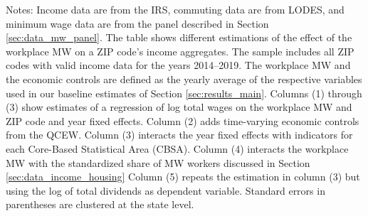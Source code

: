 \begin{table}[hbt!]
    \begin{minipage}{.95\textwidth} \footnotesize
        \vspace{2mm}
        Notes: 
        Income data are from the IRS, commuting data are from LODES, and minimum wage 
        data are from the panel described in Section \ref{sec:data_mw_panel}.
        The table shows different estimations of the effect of the workplace MW
        on a ZIP code's income aggregates.
        The sample includes all ZIP codes with valid income data for the years 
        2014--2019.
        The workplace MW and the economic controls are defined as the yearly 
        average of the respective variables used in our baseline estimates of 
        Section \ref{sec:results_main}.
        Columns (1) through (3) show estimates of a regression of log total wages
        on the workplace MW and ZIP code and year fixed effects.
        Column (2) adds time-varying economic controls from the QCEW.
        Column (3) interacts the year fixed effects with indicators for each
        Core-Based Statistical Area (CBSA).
        Column (4) interacts the workplace MW with the standardized share of MW 
        workers discussed in Section \ref{sec:data_income_housing}
        Column (5) repeats the estimation in column (3) but using the log of 
        total dividends as dependent variable.
        Standard errors in parentheses are clustered at the state level.
    \end{minipage}
\end{table}

